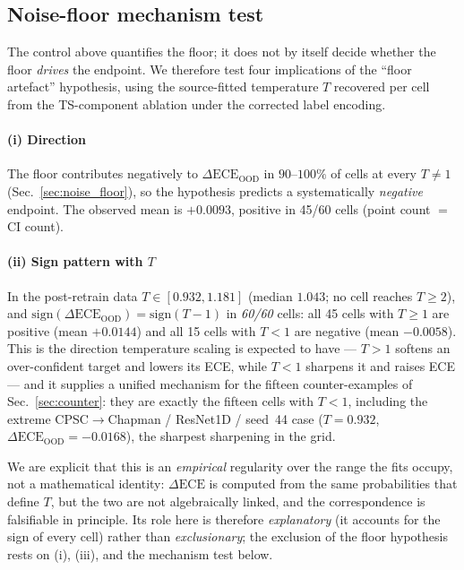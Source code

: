 \documentclass[review,12pt,nonatbib]{elsarticle}
\begin{document}
\subsection{Noise-floor mechanism test}
\label{sec:noise_mechanism}
The control above quantifies the floor; it does not by itself decide
whether the floor \emph{drives} the endpoint. We therefore test four
implications of the ``floor artefact'' hypothesis, using the
source-fitted temperature $T$ recovered per cell from the TS-component
ablation under the corrected label encoding.

\paragraph{(i) Direction} The floor contributes negatively to
$\Delta\text{ECE}_{\text{OOD}}$ in $90$--$100\%$ of cells at every
$T \neq 1$ (Sec.~\ref{sec:noise_floor}), so the hypothesis predicts a
systematically \emph{negative} endpoint. The observed mean is
$+0.0093$, positive in 45/60 cells (point count $=$ CI count).

\paragraph{(ii) Sign pattern with $T$} In the post-retrain data
$T \in [0.932, 1.181]$ (median $1.043$; no cell reaches $T \geq 2$), and
$\mathrm{sign}(\Delta\text{ECE}_{\text{OOD}}) = \mathrm{sign}(T - 1)$ in
\emph{60/60} cells: all 45 cells with $T \geq 1$ are positive (mean
$+0.0144$) and all 15 cells with $T < 1$ are negative (mean $-0.0058$).
This is the direction temperature scaling is expected to have --- $T>1$
softens an over-confident target and lowers its ECE, while $T<1$ sharpens
it and raises ECE --- and it supplies a unified mechanism for the fifteen
counter-examples of Sec.~\ref{sec:counter}: they are exactly the fifteen
cells with $T<1$, including the extreme CPSC$\rightarrow$Chapman /
ResNet1D / seed~44 case ($T = 0.932$,
$\Delta\text{ECE}_{\text{OOD}} = -0.0168$), the sharpest sharpening in
the grid.

We are explicit that this is an \emph{empirical} regularity over the
range the fits occupy, not a mathematical identity: $\Delta\text{ECE}$
is computed from the same probabilities that define $T$, but the two are
not algebraically linked, and the correspondence is falsifiable in
principle. Its role
here is therefore \emph{explanatory} (it accounts for the sign of every
cell) rather than \emph{exclusionary}; the exclusion of the floor
hypothesis rests on (i), (iii), and the mechanism test below.
\end{document}
